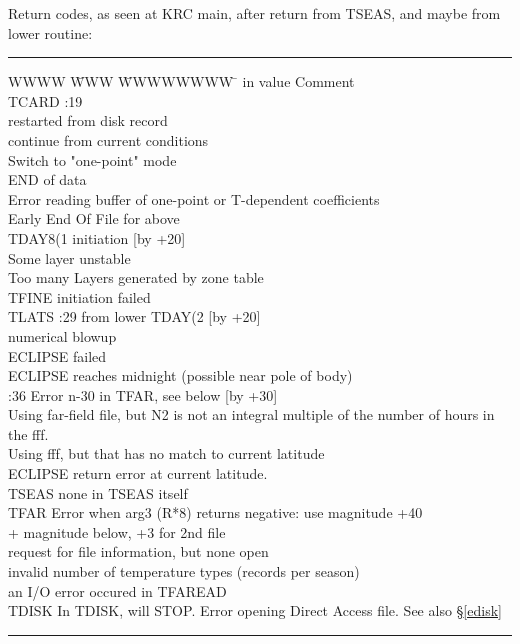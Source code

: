 \documentclass{article}
\begin{document}
\begin{table} 
\caption[Return codes]{Return codes, as seen at KRC main, after return from TSEAS, and maybe from lower routine:}
\label{ercode.tab}
\rule[.05in]{7.in}{.01in}
\begin{tabbing} 
WWWW \= WWW \= WWWWWWWW \=   \kill 
in  \>  value\> Comment  \\
TCARD \> :19 \\
    \> restarted from disk record \\
    \> continue from current conditions \\
    \> Switch to "one-point" mode \\
    \> END of data  \\
    \> Error reading buffer of one-point or T-dependent coefficients \\
    \> Early End Of File for above \\
TDAY8(1 \> \> initiation  [by +20] \\
    \> Some layer unstable   \\
    \> Too many Layers generated by zone table \\
    \> TFINE initiation failed  \\
TLATS \> :29 from lower TDAY(2 [by +20] \\
    \> numerical blowup \\
    \> ECLIPSE failed \\
    \> ECLIPSE reaches midnight (possible near pole of body) \\
   :36 \> Error n-30 in TFAR, see below [by +30] \\
    \> Using far-field file, but N2 is not an integral multiple of the number of hours in the fff. \\
    \> Using fff, but that has no match to current latitude \\
    \> ECLIPSE return error at current latitude. \\
TSEAS \>  \> none in TSEAS itself \\
TFAR \> \> Error when arg3 (R*8) returns negative: use magnitude +40 \\
  + \>  magnitude below, +3 for 2nd file \\
     \>   request for file information, but none open \\
     \>   invalid number of temperature types (records per season) \\
     \>   an I/O error occured in TFAREAD \\ 
TDISK \> \> In TDISK, will STOP. Error opening Direct Access file. See also \S \ref{edisk} \\
\end{tabbing} 
\rule[.25in]{7.in}{.01in}
\vspace{-.1in}
\end{table}
\end{document}

